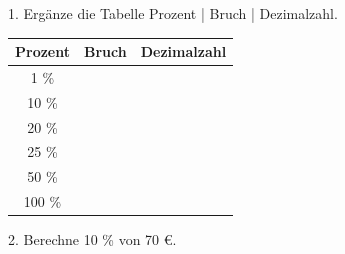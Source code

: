 \documentclass[11pt]{article}
\begin{document}
\pfheftstil
{}
\pfrueckblick
\begin{pfaufg}{}{1.}{}
Ergänze die Tabelle Prozent | Bruch | Dezimalzahl.
\par\smallskip\noindent \begingroup\renewcommand{\arraystretch}{1.3}\begin{tabular}{|c|c|c|}\hline \textbf{Prozent} & \textbf{Bruch} & \textbf{Dezimalzahl} \\ \hline 1 \% & \rule{0pt}{3ex}\hspace{1.6cm} & \rule{0pt}{3ex}\hspace{1.6cm} \\ \hline 10 \% & \rule{0pt}{3ex}\hspace{1.6cm} & \rule{0pt}{3ex}\hspace{1.6cm} \\ \hline 20 \% & \rule{0pt}{3ex}\hspace{1.6cm} & \rule{0pt}{3ex}\hspace{1.6cm} \\ \hline 25 \% & \rule{0pt}{3ex}\hspace{1.6cm} & \rule{0pt}{3ex}\hspace{1.6cm} \\ \hline 50 \% & \rule{0pt}{3ex}\hspace{1.6cm} & \rule{0pt}{3ex}\hspace{1.6cm} \\ \hline 100 \% & \rule{0pt}{3ex}\hspace{1.6cm} & \rule{0pt}{3ex}\hspace{1.6cm} \\ \hline\end{tabular}\endgroup\par
{}
\end{pfaufg}
\begin{pfaufg}{}{2.}{}
Berechne 10 \% von 70 €.
\end{pfaufg}
\pfgruppe{}
\end{document}
